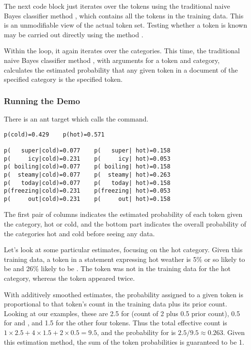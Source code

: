The next code block just iterates over the tokens using the
traditional naive Bayes classifier method ,
which contains all the tokens in the training data.  This is
an unmodifiable view of the actual token set.  Testing whether
a token is known may be carried out directly using the method
.

Within the loop, it again iterates over the categories.  This time,
the traditional naive Bayes classifier method , with
arguments for a token and category, calculates the estimated
probability that any given token in a document of the specified
category is the specified token.
%


\subsubsection{Running the Demo}

There is an ant target  which calls the 
command.

\begin{verbatim}
p(cold)=0.429    p(hot)=0.571

p(   super|cold)=0.077    p(   super| hot)=0.158
p(     icy|cold)=0.231    p(     icy| hot)=0.053
p( boiling|cold)=0.077    p( boiling| hot)=0.158
p(  steamy|cold)=0.077    p(  steamy| hot)=0.263
p(   today|cold)=0.077    p(   today| hot)=0.158
p(freezing|cold)=0.231    p(freezing| hot)=0.053
p(     out|cold)=0.231    p(     out| hot)=0.158
\end{verbatim}
%
The first pair of columns indicates the estimated probability of each
token given the category, hot or cold, and the bottom part indicates
the overall probability of the categories hot and cold before seeing
any data.  

Let's look at some particular estimates, focusing on the hot category.
Given this training data, a token in a statement expressing hot
weather is 5\% or so likely to be  and 26\% likely
to be .  The token  was
not in the training data for the hot category, whereas the token
 appeared twice.  

With additively smoothed estimates, the probability assigned to a
given token is proportional to that token's count in the training data
plus its prior count.  Looking at our examples, these are 2.5 for
 (count of 2 plus 0.5 prior count), 0.5 for
 and , and 1.5 for the
other four tokens.  Thus the total effective count is $1 \times 2.5 +
4 \times 1.5 + 2 \times 0.5 = 9.5$, and the probability for
 is $2.5/9.5 \approx 0.263$.  Given this
estimation method, the sum of the token probabilities is guaranteed to
be 1.

